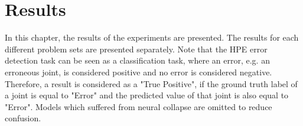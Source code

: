 \chapter{Results}
\label{sec:results}
In this chapter, the results of the experiments are presented. The results for each different problem sets are presented separately. Note that the HPE error detection task can be seen as a classification task, where an error, e.g. an erroneous joint, is considered positive and no error is considered negative. Therefore, a result is considered as a "True Positive", if the ground truth label of a joint is equal to "Error" and the predicted value of that joint is also equal to "Error". Models which suffered from neural collapse are omitted to reduce confusion.



